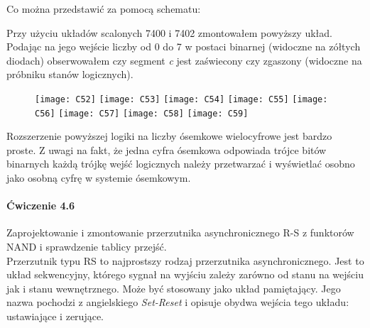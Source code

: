 \documentclass[14pt, table]{extarticle}
\begin{document}
Co można przedstawić za pomocą schematu:

\begin{center}
\end{center}

Przy użyciu układów scalonych 7400 i 7402 zmontowałem powyższy układ. Podając na jego wejście liczby od 0 do 7 w postaci binarnej (widoczne na zółtych diodach) obserwowałem czy segment \textit{c} jest zaświecony czy zgaszony (widoczne na próbniku stanów logicznych).

\begin{figure}[H]
\texttt{[image: C52]} 
\texttt{[image: C53]} 
\texttt{[image: C54]} 
\texttt{[image: C55]} 
\texttt{[image: C56]} 
\texttt{[image: C57]} 
\texttt{[image: C58]}
\texttt{[image: C59]}
\centering
\captionsetup{labelformat=empty}
\caption{}
\end{figure}

Rozszerzenie powyższej logiki na liczby ósemkowe wielocyfrowe jest bardzo proste. Z uwagi na fakt, że jedna cyfra ósemkowa odpowiada trójce bitów binarnych każdą trójkę wejść logicznych należy przetwarzać i wyświetlać osobno jako osobną cyfrę w systemie ósemkowym.


\newpage
\paragraph{Ćwiczenie 4.6 \\}
Zaprojektowanie i zmontowanie przerzutnika asynchronicznego R-S z funktorów NAND i sprawdzenie tablicy przejść. \\

Przerzutnik typu RS to najprostszy rodzaj przerzutnika asynchronicznego. Jest to układ sekwencyjny, którego sygnał na wyjściu zależy zarówno od stanu na wejściu jak i stanu wewnętrznego. Może być stosowany jako układ pamiętający. Jego nazwa pochodzi z angielskiego \textit{Set-Reset} i opisuje obydwa wejścia tego układu: ustawiające i zerujące. \\
\end{document}
